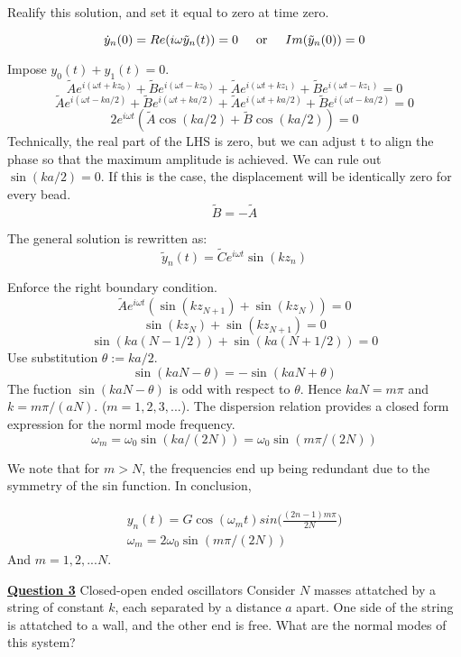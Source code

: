 \documentclass{article}
\newcommand{\new}[1]{
    \vspace{2mm}
    \noindent
    \textbf{
    \underline{#1}}
}
\newcommand{\textOr}{
    {
        \hspace{5mm}
        \textrm{or}
        \hspace{5mm}
    }
}
\newcommand{\Ixp}[1]{
    {
        e^{i{#1}}
    }
}
\begin{document}
Realify this solution, and set it equal to zero at time zero. 

\[
    \dot{y}_n(0) = Re(i\omega \tilde{y}_n(t)) = 0
    \textOr 
    Im(\tilde{y}_n(0)) = 0
\]


Impose $y_0(t) + y_1(t) = 0$. 
\[
     \tilde{A}\Ixp{(\omega t + kz_0)}
    + \tilde{B}\Ixp{(\omega t - kz_0)} 
    +
 \tilde{A}\Ixp{(\omega t + kz_1)}
    + \tilde{B}\Ixp{(\omega t - kz_1)}
    = 0 
\]
\[
     \tilde{A}\Ixp{(\omega t -ka/2)}
    + \tilde{B}\Ixp{(\omega t +ka/2)} 
    +
 \tilde{A}\Ixp{(\omega t + ka/2)}
    + \tilde{B}\Ixp{(\omega t - ka/2)}
    = 0 
\]
\[
    2\Ixp{\omega t} (
        \tilde{A} \cos (ka/2)
        + \tilde{B} \cos (ka/2)
    )
    = 0
\]
Technically, the real part of the LHS is zero, but we 
can adjust t to align the phase so that the maximum amplitude is 
achieved. 
We can rule out $\sin(ka/2) = 0$. If this is the case, 
the displacement will be identically zero for every bead. 
\[
    \tilde{B} = -\tilde{A}
\]

The general solution is rewritten as:
\[
    \tilde{y}_n(t) = \tilde{C} \Ixp{\omega t} \sin(kz_n)
\]

Enforce the right boundary condition. 
\[
    \tilde{A} \Ixp{\omega t} (\sin(kz_{N + 1}) + \sin(kz_N)) = 0
\]
\[
    \sin(kz_N) + \sin(kz_{N + 1}) = 0
\]
\[
    \sin(ka(N -1/2)) +  \sin(ka(N +1/2)) = 0 
\]
Use substitution $\theta:= ka/2$. 
\[
    \sin(kaN- \theta) = -\sin(kaN + \theta)
\]
The fuction $\sin(kaN - \theta)$ is odd with respect 
to $\theta$. Hence $kaN = m\pi$ and $k = m\pi/(aN)$. 
($m = 1, 2, 3, ...$). The dispersion relation provides 
a closed form expression for the norml mode frequency. 
\[
    \omega_m = \omega_0 \sin(ka/(2N)) = \omega_0 \sin(m\pi/(2N))
\]

We note that for $m > N$, the frequencies end up being redundant 
due to the symmetry of the sin function. In conclusion, 

\begin{align*}
    \boxed{
    y_n(t) = G\cos(\omega_m t)sin\bigg(\frac{(2n - 1)m \pi}{2N}\bigg)}\\
    \boxed{
    \omega_m = 2\omega_0 \sin(m\pi/(2N))
    }
\end{align*}
And $m = 1, 2, ... N$. 

\newpage

\new{Question 3} Closed-open ended oscillators 
Consider $N$ masses attatched by a string of constant $k$, 
each separated by a distance $a$ apart. One side of the 
string is attatched to a wall, and the other end is free. 
What are the normal modes of this system?
\end{document}
